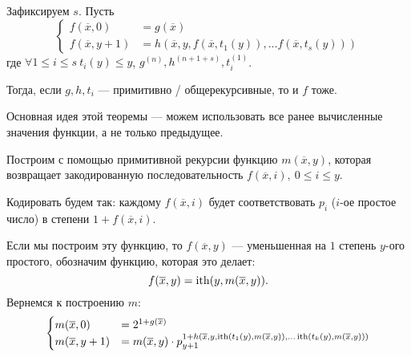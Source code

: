 \begin{thm}
    Зафиксируем $ s$. Пусть 
	\[
	\begin{cases}
		f(\overline{x}, 0) &= g(\overline{x}) \\
		f(\overline{x}, y+1) &= h(\overline{x}, y, f(\overline{x}, t_1(y)), \ldots f(\overline{x}, t_{s}(y)))
	\end{cases}
	\] 
	где $ \forall 1 \le i \le s ~t_i(y) \le y$, $ g^{(n)}, h^{(n+1+s)}, t_i^{(1)}$.

	\noindent
	Тогда, если $ g, h, t_i$ --- примитивно / общерекурсивные, то и $ f$ тоже.
\end{thm}
Основная идея этой теоремы --- можем использовать все ранее вычисленные значения функции, а не только предыдущее.
\begin{proof*}
	Построим с помощью примитивной рекурсии функцию $ m(\overline{x}, y)$, которая возвращает закодированную последовательность $ f(\overline{x}, i), ~ 0 \le i \le y$.

	Кодировать будем так: каждому $ f(\overline{x}, i)$ будет соответствовать $ p_i$ ($ i$-ое простое число) в степени $ 1 + f(\overline{x}, i)$. 

	Если мы построим эту функцию, то $ f(\overline{x}, y)$ --- уменьшенная на $ 1$ степень $ y$-ого простого, обозначим функцию, которая это делает:
	\[
		f(\overline{x}, y) = \operatorname{ith}(y, m(\overline{x}, y))
	.\] 
	Вернемся к построению $ m$:
	\[
	\begin{cases}
		m(\overline{x}, 0) &= 2^{1+g(\overline{x})} \\
		m(\overline{x}, y+1) &= m(\overline{x}, y) \cdot p_{y+1}^{1+h\left( 
			\overline{x}, y, \operatorname{ith}(t_1(y), m(\overline{x}, y)), \ldots \operatorname{ith}(t_{k}(y), m(\overline{x}, y))
	\right)
}
	\end{cases}
	\] 
\end{proof*}


